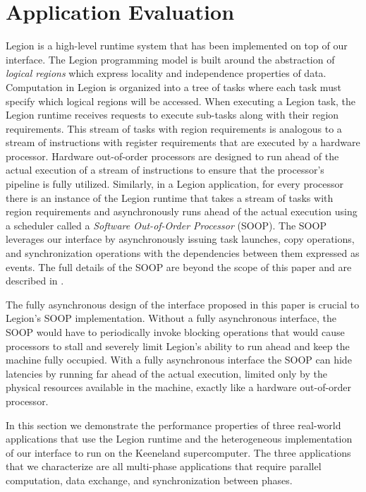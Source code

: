 
\section{Application Evaluation}
\label{sec:apps}
Legion\cite{Legion12} is a high-level runtime system that has been implemented on top
of our interface.  
The Legion programming model is built around the abstraction of 
{\em logical regions} which express locality and independence properties 
of data.  Computation in Legion is organized into a tree of tasks where 
each task must specify which logical regions will be accessed.
When executing a Legion task, the Legion runtime receives requests
to execute sub-tasks along with their region requirements.
This stream of tasks with region requirements is analogous to a stream
of instructions with register requirements that are executed by 
a hardware processor.  Hardware out-of-order processors are designed to
run ahead of the actual execution of a stream of instructions
to ensure that the processor's pipeline is fully utilized.  Similarly, in a
Legion application, for every processor there is an instance of the Legion runtime
that takes a stream of tasks with region requirements and asynchronously
runs ahead of the actual execution using a scheduler called a {\em Software Out-of-Order Processor} 
(SOOP).  The SOOP leverages our interface by asynchronously issuing task launches, copy
operations, and synchronization operations with the dependencies between them expressed
as events.  The full details of the SOOP are beyond the scope of this paper
and are described in \cite{Legion12}.

The fully asynchronous design of the interface proposed in
this paper is crucial to Legion's SOOP implementation.  Without a fully
asynchronous interface, the SOOP would have to periodically invoke
blocking operations that would cause processors to stall and severely
limit Legion's ability to run ahead and keep the machine fully
occupied.  With a fully asynchronous interface the SOOP can hide latencies by 
running
far ahead of the actual execution, limited only by the physical resources
available in the machine, exactly like a hardware out-of-order processor.

In this section we demonstrate the performance properties of three
real-world applications that use the Legion runtime and the heterogeneous
implementation of our interface to run on the Keeneland supercomputer.
The three applications that we characterize are all multi-phase
applications that require parallel computation, data exchange, and
synchronization between phases. 

